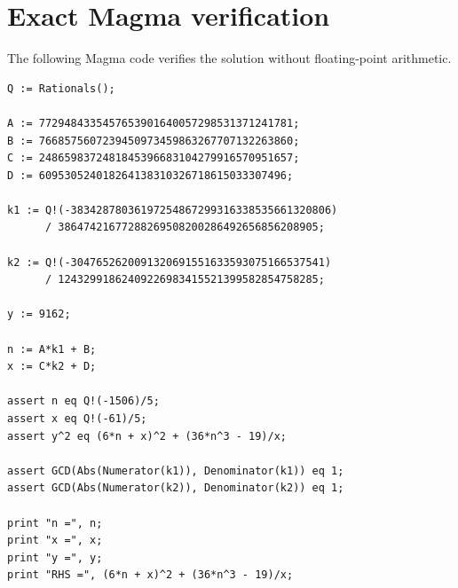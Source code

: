 \documentclass[11pt]{article}
\begin{document}
\clearpage
\appendix
\section{Exact Magma verification}

The following Magma code verifies the solution without floating-point
arithmetic.

{\small
\begin{verbatim}
Q := Rationals();

A := 7729484335457653901640057298531371241781;
B := 7668575607239450973459863267707132263860;
C := 2486598372481845396683104279916570951657;
D := 609530524018264138310326718615033307496;

k1 := Q!(-38342878036197254867299316338535661320806)
      / 38647421677288269508200286492656856208905;

k2 := Q!(-3047652620091320691551633593075166537541)
      / 12432991862409226983415521399582854758285;

y := 9162;

n := A*k1 + B;
x := C*k2 + D;

assert n eq Q!(-1506)/5;
assert x eq Q!(-61)/5;
assert y^2 eq (6*n + x)^2 + (36*n^3 - 19)/x;

assert GCD(Abs(Numerator(k1)), Denominator(k1)) eq 1;
assert GCD(Abs(Numerator(k2)), Denominator(k2)) eq 1;

print "n =", n;
print "x =", x;
print "y =", y;
print "RHS =", (6*n + x)^2 + (36*n^3 - 19)/x;
\end{verbatim}
}
\end{document}
